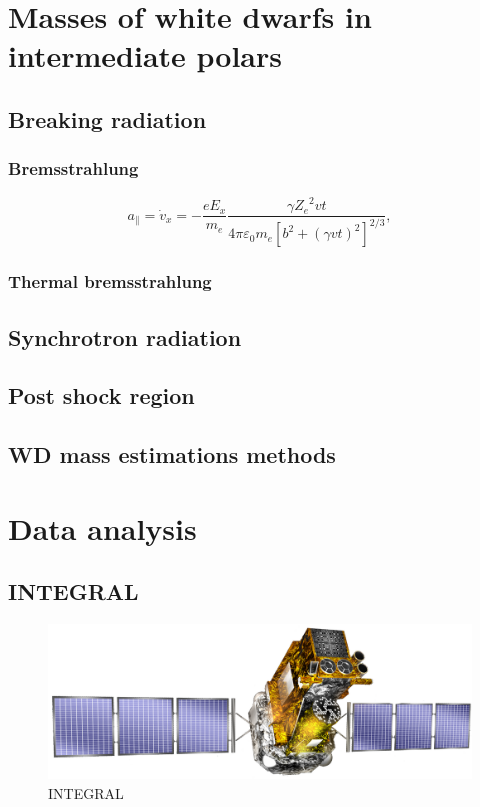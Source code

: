 \documentclass[oneside,a4paper,11pt]{report}
\begin{document}
\chapter{Masses of white dwarfs in intermediate polars}
\section{Breaking radiation}
\subsection{Bremsstrahlung}
\begin{equation}
 a_{\parallel} = \dot{v}_x = -\frac{eE_x}{m_e}\frac{\gamma {Z_e}^2 vt}{4\pi \varepsilon_0 m_e \left [ b^2 + \left ( \gamma vt \right )^2  \right ]^{2/3}}, 
\end{equation}
\subsection{Thermal bremsstrahlung}



\section{Synchrotron radiation}
\section{Post shock region}
\section{WD mass estimations methods}

\chapter{Data analysis}

\section{INTEGRAL}

\begin{figure}[!hbt]
\centering
\includegraphics[totalheight=4cm]{integral}
\caption{INTEGRAL}
\label{microblazar} 
\end{figure}
\end{document}
